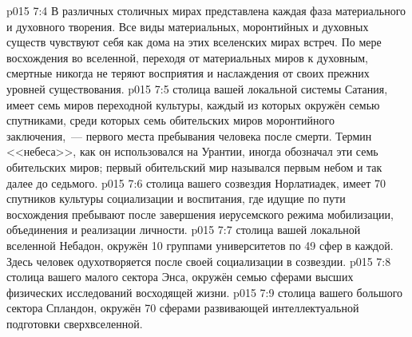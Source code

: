 \vs p015 7:4 В различных столичных мирах представлена каждая фаза материального и духовного творения. Все виды материальных, моронтийных и духовных существ чувствуют себя как дома на этих вселенских мирах встреч. По мере восхождения во вселенной, переходя от материальных миров к духовным, смертные никогда не теряют восприятия и наслаждения от своих прежних уровней существования.
\vs p015 7:5 \pc {} столица вашей локальной системы Сатания, имеет семь миров переходной культуры, каждый из которых окружён семью спутниками, среди которых семь обительских миров моронтийного заключения,~--- первого места пребывания человека после смерти. Термин <<небеса>>, как он использовался на Урантии, иногда обозначал эти семь обительских миров; первый обительский мир назывался первым небом и так далее до седьмого.
\vs p015 7:6 \pc {} столица вашего созвездия Норлатиадек, имеет 70 спутников культуры социализации и воспитания, где идущие по пути восхождения пребывают после завершения иерусемского режима мобилизации, объединения и реализации личности.
\vs p015 7:7 \pc {} столица вашей локальной вселенной Небадон, окружён 10 группами университетов по 49 сфер в каждой. Здесь человек одухотворяется после своей социализации в созвездии.
\vs p015 7:8 \pc {} столица вашего малого сектора Энса, окружён семью сферами высших физических исследований восходящей жизни.
\vs p015 7:9 \pc {} столица вашего большого сектора Спландон, окружён 70 сферами развивающей интеллектуальной подготовки сверхвселенной.
